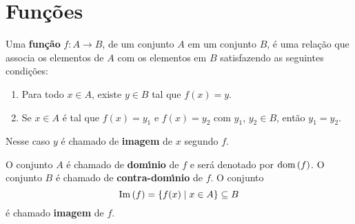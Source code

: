 \chapter{Fun{\c c}{\~o}es}

\begin{definicao}
Uma \textbf{fun{\c c}{\~a}o} $f : A \to B$, de um conjunto $A$ em um conjunto $B$, {\'e} uma rela{\c c}{\~a}o que associa os elementos de $A$ com os elementos em $B$ satisfazendo as seguintes condições:
	\begin{enumerate}[label={\roman*})]
		\item Para todo $x \in A$, existe $y \in B$ tal que $f(x) = y$.
		\item  Se $x \in A$ \'e tal que $f(x) = y_1$ e $f(x) = y_2$ com $y_1$, $y_2 \in B$, ent\~ao $y_1 = y_2$.
	\end{enumerate}
Nesse caso $y$ \'e chamado de \textbf{imagem} de $x$ segundo $f$.
\end{definicao}

O conjunto $A$ {\'e} chamado de \textbf{dom{\'\i}nio} de $f$ e ser\'a denotado por ${\rm dom\,}(f)$. O conjunto $B$ {\'e} chamado de \textbf{contra-dom{\'\i}nio} de $f$. O conjunto
\[
	{\rm Im\,}(f) = \{f(x) \mid x \in A\} \subseteq B
\]
\'e chamado \textbf{imagem} de $f$.

